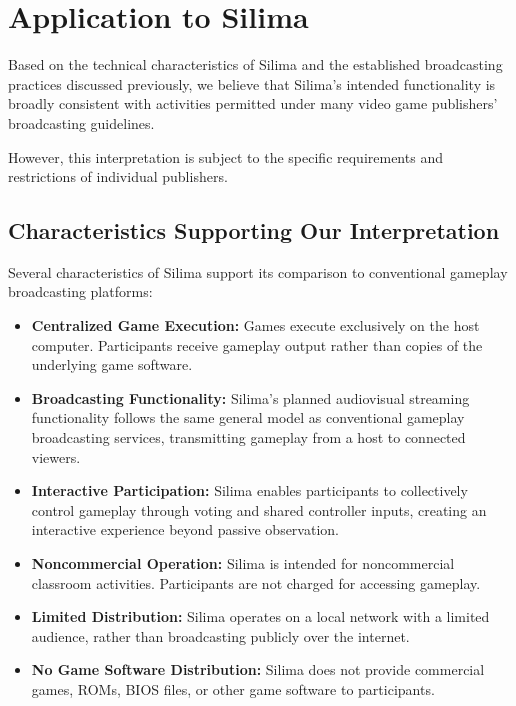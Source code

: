 \section{Application to Silima}

Based on the technical characteristics of Silima and the
established broadcasting practices discussed previously,
we believe that Silima's intended functionality is broadly
consistent with activities permitted under many video game
publishers' broadcasting guidelines.

However, this interpretation is subject to the specific
requirements and restrictions of individual publishers.

\subsection{Characteristics Supporting Our Interpretation}

Several characteristics of Silima support its comparison
to conventional gameplay broadcasting platforms:

\begin{itemize}
    \item \textbf{Centralized Game Execution:}
    Games execute exclusively on the host computer.
    Participants receive gameplay output rather than
    copies of the underlying game software.

    \item \textbf{Broadcasting Functionality:}
    Silima's planned audiovisual streaming functionality
    follows the same general model as conventional
    gameplay broadcasting services, transmitting gameplay
    from a host to connected viewers.

    \item \textbf{Interactive Participation:}
    Silima enables participants to collectively control
    gameplay through voting and shared controller inputs,
    creating an interactive experience beyond passive
    observation.

    \item \textbf{Noncommercial Operation:}
    Silima is intended for noncommercial classroom
    activities. Participants are not charged for
    accessing gameplay.

    \item \textbf{Limited Distribution:}
    Silima operates on a local network with a limited
    audience, rather than broadcasting publicly over
    the internet.

    \item \textbf{No Game Software Distribution:}
    Silima does not provide commercial games, ROMs,
    BIOS files, or other game software to participants.
\end{itemize}

